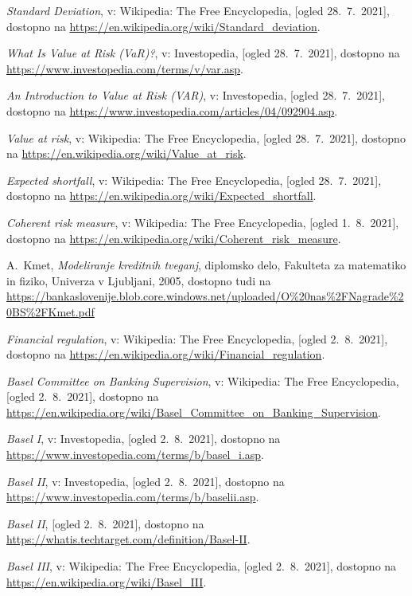 \documentclass[12pt,a4paper]{amsart}
\theoremstyle{definition} %
\theoremstyle{plain} %
\begin{document}
\begin{thebibliography}{99}
\emph{Standard Deviation}, v: Wikipedia: The Free Encyclopedia, [ogled 28.~7.~2021], dostopno na \url{https://en.wikipedia.org/wiki/Standard_deviation}.

\emph{What Is Value at Risk (VaR)?}, v: Investopedia, [ogled 28.~7.~2021], dostopno na \url{https://www.investopedia.com/terms/v/var.asp}.

\emph{An Introduction to Value at Risk (VAR)}, v: Investopedia, [ogled 28.~7.~2021], dostopno na \url{https://www.investopedia.com/articles/04/092904.asp}.

\emph{Value at risk}, v: Wikipedia: The Free Encyclopedia, [ogled 28.~7.~2021], dostopno na \url{https://en.wikipedia.org/wiki/Value_at_risk}.

\emph{Expected shortfall}, v: Wikipedia: The Free Encyclopedia, [ogled 28.~7.~2021], dostopno na \url{https://en.wikipedia.org/wiki/Expected_shortfall}.

\emph{Coherent risk measure}, v: Wikipedia: The Free Encyclopedia, [ogled 1.~8.~2021], dostopno na \url{https://en.wikipedia.org/wiki/Coherent_risk_measure}.

A.~Kmet, \emph{Modeliranje kreditnih tveganj}, diplomsko delo, Fakulteta za matematiko in fiziko, Univerza v Ljubljani, 2005, dostopno tudi na \url{https://bankaslovenije.blob.core.windows.net/uploaded/O\%20nas\%2FNagrade\%20BS\%2FKmet.pdf}

\emph{Financial regulation}, v: Wikipedia: The Free Encyclopedia, [ogled 2.~8.~2021], dostopno na \url{https://en.wikipedia.org/wiki/Financial_regulation}.

\emph{Basel Committee on Banking Supervision}, v: Wikipedia: The Free Encyclopedia, [ogled 2.~8.~2021], dostopno na \url{https://en.wikipedia.org/wiki/Basel_Committee_on_Banking_Supervision}.

\emph{Basel I}, v: Investopedia, [ogled 2.~8.~2021], dostopno na \url{https://www.investopedia.com/terms/b/basel_i.asp}.

\emph{Basel II}, v: Investopedia, [ogled 2.~8.~2021], dostopno na \url{https://www.investopedia.com/terms/b/baselii.asp}.

\emph{Basel II}, [ogled 2.~8.~2021], dostopno na \url{https://whatis.techtarget.com/definition/Basel-II}.

\emph{Basel III}, v: Wikipedia: The Free Encyclopedia, [ogled 2.~8.~2021], dostopno na \url{https://en.wikipedia.org/wiki/Basel_III}.


\end{thebibliography}
\end{document}
